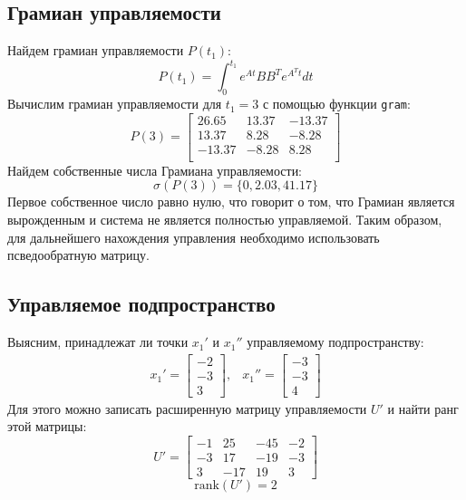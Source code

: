 \subsection{Грамиан управляемости}
Найдем грамиан управляемости $P(t_1)$:
\begin{equation}
    P(t_1) = \int_{0}^{t_1} e^{At}BB^Te^{A^Tt}dt
\end{equation}
Вычислим грамиан управляемости для $t_1 = 3$ с помощью функции \texttt{gram}: 
\begin{equation}
    P(3) = \begin{bmatrix}
        26.65 & 13.37 & -13.37 \\ 
        13.37 & 8.28 & -8.28 \\ 
        -13.37 & -8.28 & 8.28 \\ 
    \end{bmatrix}
\end{equation}
Найдем собственные числа Грамиана управляемости:
\begin{equation}
   \sigma(P(3)) = \{0, 2.03, 41.17 \}
\end{equation}
Первое собственное число равно нулю, что говорит о том, что Грамиан является вырожденным и система не является полностью
управляемой. Таким образом, для дальнейшего нахождения управления необходимо использовать псведообратную матрицу. 

\subsection{Управляемое подпространство}
Выясним, принадлежат ли точки $x_1'$ и $x_1''$ управляемому подпространству:
\begin{equation}
    \begin{array}{cc}
        x_1' = \begin{bmatrix}
            -2 \\
            -3 \\
            3
        \end{bmatrix}, &
        x_1'' = \begin{bmatrix}
            -3 \\
            -3 \\
            4
        \end{bmatrix}
    \end{array}
\end{equation}
Для этого можно записать расширенную матрицу управляемости $U'$ и найти ранг этой матрицы:
\begin{equation}
    U' = \begin{bmatrix}
        -1 & 25 & -45 & -2 \\
        -3 & 17 & -19 & -3 \\
        3 & -17 & 19 & 3
    \end{bmatrix}
\end{equation}
\begin{equation}
    \text{rank}(U') = 2
\end{equation}

